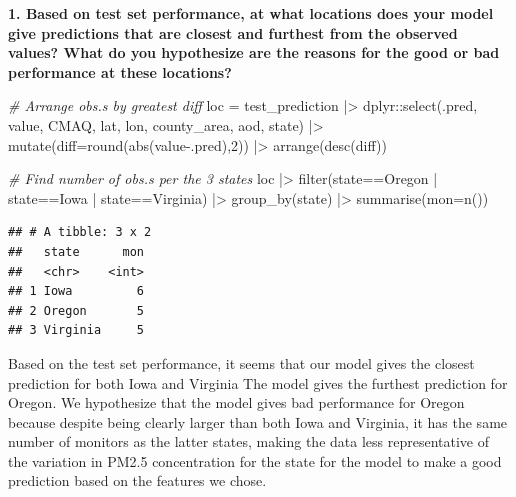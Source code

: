 \documentclass[
]{article}
\newenvironment{Shaded}{\begin{snugshade}}{\end{snugshade}}
\newcommand{\AttributeTok}[1]{\textcolor[rgb]{0.77,0.63,0.00}{#1}}
\newcommand{\CommentTok}[1]{\textcolor[rgb]{0.56,0.35,0.01}{\textit{#1}}}
\newcommand{\DecValTok}[1]{\textcolor[rgb]{0.00,0.00,0.81}{#1}}
\newcommand{\FunctionTok}[1]{\textcolor[rgb]{0.00,0.00,0.00}{#1}}
\newcommand{\NormalTok}[1]{#1}
\newcommand{\OtherTok}[1]{\textcolor[rgb]{0.56,0.35,0.01}{#1}}
\newcommand{\SpecialCharTok}[1]{\textcolor[rgb]{0.00,0.00,0.00}{#1}}
\newcommand{\StringTok}[1]{\textcolor[rgb]{0.31,0.60,0.02}{#1}}
\begin{document}
\textbf{1. Based on test set performance, at what locations does your
model give predictions that are closest and furthest from the observed
values? What do you hypothesize are the reasons for the good or bad
performance at these locations?}

\begin{Shaded}
\begin{Highlighting}[]
\CommentTok{\# Arrange obs.s by greatest diff}
\NormalTok{loc }\OtherTok{=}\NormalTok{ test\_prediction }\SpecialCharTok{|\textgreater{}}\NormalTok{ dplyr}\SpecialCharTok{::}\FunctionTok{select}\NormalTok{(.pred, value, CMAQ, lat, lon, county\_area, aod, state) }\SpecialCharTok{|\textgreater{}} \FunctionTok{mutate}\NormalTok{(}\AttributeTok{diff=}\FunctionTok{round}\NormalTok{(}\FunctionTok{abs}\NormalTok{(value}\SpecialCharTok{{-}}\NormalTok{.pred),}\DecValTok{2}\NormalTok{)) }\SpecialCharTok{|\textgreater{}} \FunctionTok{arrange}\NormalTok{(}\FunctionTok{desc}\NormalTok{(diff))}

\CommentTok{\# Find number of obs.s per the 3 states}
\NormalTok{loc }\SpecialCharTok{|\textgreater{}} \FunctionTok{filter}\NormalTok{(state}\SpecialCharTok{==}\StringTok{\textquotesingle{}Oregon\textquotesingle{}} \SpecialCharTok{|}\NormalTok{ state}\SpecialCharTok{==}\StringTok{\textquotesingle{}Iowa\textquotesingle{}} \SpecialCharTok{|}\NormalTok{ state}\SpecialCharTok{==}\StringTok{\textquotesingle{}Virginia\textquotesingle{}}\NormalTok{) }\SpecialCharTok{|\textgreater{}} \FunctionTok{group\_by}\NormalTok{(state) }\SpecialCharTok{|\textgreater{}} \FunctionTok{summarise}\NormalTok{(}\AttributeTok{mon=}\FunctionTok{n}\NormalTok{())}
\end{Highlighting}
\end{Shaded}

\begin{verbatim}
## # A tibble: 3 x 2
##   state      mon
##   <chr>    <int>
## 1 Iowa         6
## 2 Oregon       5
## 3 Virginia     5
\end{verbatim}

Based on the test set performance, it seems that our model gives the
closest prediction for both Iowa and Virginia The model gives the
furthest prediction for Oregon. We hypothesize that the model gives bad
performance for Oregon because despite being clearly larger than both
Iowa and Virginia, it has the same number of monitors as the latter
states, making the data less representative of the variation in PM2.5
concentration for the state for the model to make a good prediction
based on the features we chose.
\end{document}
